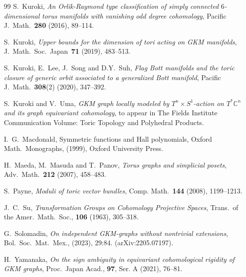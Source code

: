 \documentclass[12pt]{amsart}
\theoremstyle{definition}
\theoremstyle{remark}
\numberwithin{equation}{section}
\begin{document}
\begin{thebibliography}{99}
S.~Kuroki,
\emph{An Orlik-Raymond type classification of simply connected $6$-dimensional torus manifolds with vanishing odd degree cohomology},
Pacific J.~Math.~\textbf{280} (2016), 89--114.

S.~Kuroki,
\emph{Upper bounds for the dimension of tori acting on GKM manifolds},
J.~Math.~Soc.~Japan~\textbf{71} (2019), 483--513.

S.~Kuroki, E.~Lee, J.~Song and D.Y.~Suh,
\emph{Flag Bott manifolds and the toric closure of generic orbit associated to a generalized Bott manifold},
Pacific J.~Math.~\textbf{308}(2) (2020), 347--392.

S.~Kuroki and V.~Uma,
\emph{GKM graph locally modeled by $T^{n}\times S^{1}$-action on $T^{*}\mathbb{C}^{n}$ and its graph equivariant cohomology}, to appear in The Fields Institute Communication Volume: Toric Topology and Polyhedral Products.


I.~G.~Macdonald,
Symmetric functions and Hall polynomials,
Oxford Math.~Monographs, (1999), Oxford University Press.


H.~Maeda, M.~Masuda and T.~Panov,
\emph{Torus graphs and simplicial posets},
Adv.\ Math.~\textbf{212} (2007), 458--483.


S.~Payne,
\emph{Moduli of toric vector bundles},
Comp. Math.~\textbf{144} (2008), 1199--1213.

J.~C.~Su,
\emph{Transformation Groups on Cohomology Projective Spaces},
Trans.~of the Amer.~Math.~Soc., \textbf{106} (1963), 305--318.

G.~Solomadin,
\emph{On independent GKM-graphs without nontrivial extensions},
Bol.~Soc.~Mat.~Mex., (2023), 29:84.
(arXiv:2205.07197).

H.~Yamanaka,
\emph{On the sign ambiguity in equivariant cohomological rigidity of GKM graphs},
Proc.~Japan Acad., \textbf{97}, Ser. A (2021), 76--81.

\end{thebibliography}
\end{document}
